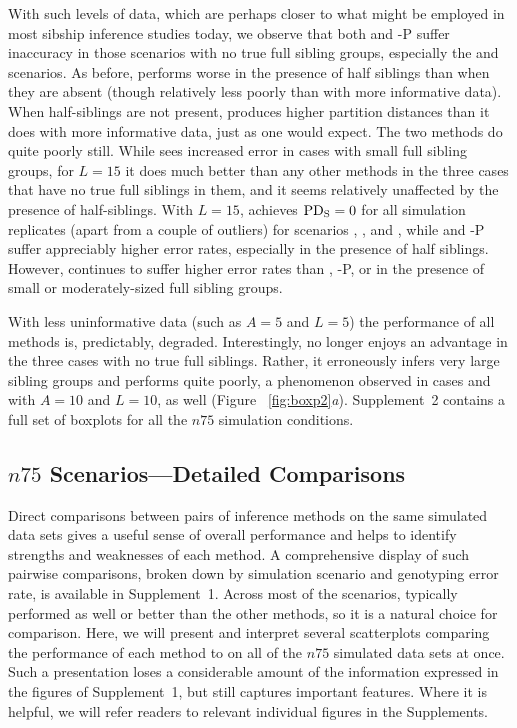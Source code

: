 \documentclass[11pt]{article}
\begin{document}
{With such levels of data, which are perhaps closer to what might be employed in most sibship inference 
studies today, we observe that both \colony{} and \colony{}-P suffer inaccuracy in those scenarios with 
no true full sibling groups, especially the \allhalf{} and \allpathalf{} scenarios.  As before, 
\familyfinder{} performs worse in the presence of half siblings than when they are absent (though 
relatively less poorly than with more informative data).  When half-siblings are not present, 
\familyfinder{} produces higher partition distances than it does with more informative data, just as 
one would expect.  The two \kinalyzer{} methods do quite poorly still. While \prt{} sees increased 
error in cases with small full sibling groups, for $L=15$ it does much better than any other methods in 
the three cases that have no true full siblings in them, and it seems relatively unaffected by the 
presence of half-siblings. With $L=15$, \prt{} achieves $\mathrm{PD_S}=0$ for all simulation replicates (apart 
from a couple of outliers) for scenarios \nosibs{}, \allhalf{}, and \allpathalf{}, while \colony{} and 
\colony{}-P suffer appreciably higher error rates, especially in the presence of half siblings. 
However, \prt{} continues to suffer higher error rates than \colony{}, \colony{}-P, or \familyfinder{} 
in the presence of small or moderately-sized full sibling groups.

With less uninformative data (such as $A=5$ and $L=5$) the performance of all methods is, predictably, 
degraded.  Interestingly, \prt{} no longer enjoys an advantage in the three cases with no true full 
siblings.  Rather, it erroneously infers very large sibling groups and performs quite poorly, a 
phenomenon observed in cases \allhalf{} and \allpathalf{} with $A=10$ and $L=10$, as well (Figure~
\ref{fig:boxp2}{\em a}).  Supplement~2 contains a full set of boxplots for all the $n75$ simulation 
conditions.

\subsection{$n75$ Scenarios---Detailed Comparisons}
Direct comparisons between pairs of inference methods on the same simulated data sets gives a useful 
sense of overall performance and helps to identify strengths and weaknesses of each method. A 
comprehensive display of such pairwise comparisons, broken down by simulation scenario and genotyping 
error rate, is available in Supplement~1. Across most of the scenarios, \colony{} typically performed 
as well or better than the other methods, so it is a natural choice for comparison.
Here, we will present and interpret several scatterplots comparing the performance of each method to 
\colony{} on all of the $n75$ simulated data sets at once.  Such a presentation loses a considerable 
amount of the information expressed in the figures of Supplement~1, but still captures important 
features.  Where it is helpful, we will refer readers to relevant individual figures in the 
Supplements.

}
\end{document}
